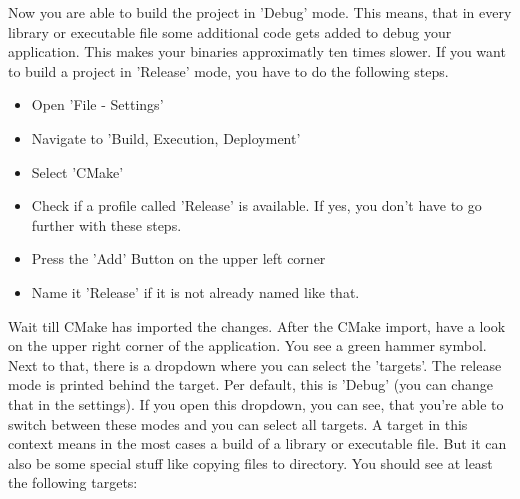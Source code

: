 Now you are able to build the project in 'Debug' mode. This means, that in every library or executable file some additional
code gets added to debug your application. This makes your binaries approximatly ten times slower. If you want to build
a project in 'Release' mode, you have to do the following steps.
\begin{itemize}
    \item Open 'File - Settings'
    \item Navigate to 'Build, Execution, Deployment'
    \item Select 'CMake'
    \item Check if a profile called 'Release' is available. If yes, you don't have to go further with these steps.
    \item Press the 'Add' Button on the upper left corner
    \item Name it 'Release' if it is not already named like that.
\end{itemize}
Wait till CMake has imported the changes. After the CMake import, have a look on the upper right corner of the application.
You see a green hammer symbol. Next to that, there is a dropdown where you can select the 'targets'.
The release mode is printed behind the target. Per default, this is 'Debug' (you can change that in the settings).
If you open this dropdown, you can see, that you're able to switch between these modes and you can select all
targets. A target in this context means in the most cases a build of a library or executable file. But it can also
be some special stuff like copying files to directory. You should see at least the following targets:
